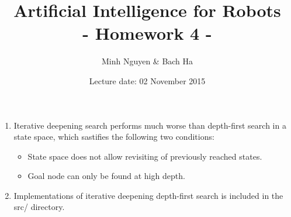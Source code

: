 \documentclass[a4paper, 12pt]{article}
\title{Artificial Intelligence for Robots \\
				- Homework 4 -}
\author{Minh Nguyen \& Bach Ha}
\date{Lecture date: 02 November 2015}
\begin{document}
\maketitle

\begin{enumerate}

	\item Iterative deepening search performs much worse than depth-first search in a state
	space, which sastifies the following two conditions:
	\begin{itemize}
		\item State space does not allow revisiting of previously reached states.
		\item Goal node can only be found at high depth.
	\end{itemize}

	\item Implementations of iterative deepening depth-first search is included in the
    src/ directory.


\end{enumerate}
\end{document}
